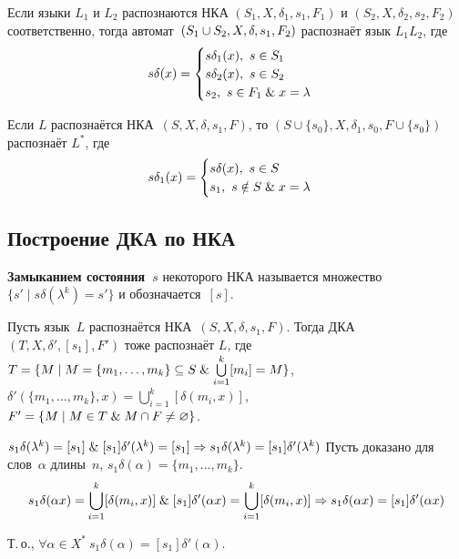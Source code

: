 Если языки $L_1$ и $L_2$ распознаются НКА $(S_1, X, \delta_1, s_1, F_1)$ и $(S_2, X, \delta_2, s_2, F_2)$ соответственно, тогда автомат~$(S_1 \opbr\cup S_2, \allowbreak X, \allowbreak \delta, \allowbreak s_1, \allowbreak F_2)$ распознаёт язык $L_1 L_2$, где
\begin{equation*}
s \delta(x) =
\begin{cases}
s \delta_1(x), \ s \in S_1 \\
s \delta_2(x), \ s \in S_2 \\
s_2, \ s \in F_1 \mathrel{\&} x = \lambda
\end{cases}
\end{equation*}

Если $L$ распознаётся НКА~$(S, X, \delta, s_1, F)$, то $(S \cup \{ s_0 \}, X, \delta_1, s_0, F \cup \{ s_0 \})$ распознаёт $L^*$, где
\begin{equation*}
s \delta_1(x) =
\begin{cases}
s \delta(x), \ s \in S \\
s_1, \ s \notin S \mathrel{\&} x = \lambda
\end{cases}
\end{equation*}

\subsection{Построение ДКА по НКА}
\label{sect:automaton_determination}
 \textbf{Замыканием состояния~$s$} некоторого НКА называется множество~$\{ s' \mid s \delta(\lambda^k) = s' \}$ и обозначается~$[s]$.

Пусть язык~$L$ распознаётся НКА~$(S, X, \delta, s_1, F)$.
Тогда ДКА~$(T, X, \delta', [s_1], F')$ тоже распознаёт $L$, где\\
$T = \{ M \mid M = \{ m_1, \ldots, m_k \} \subseteq S \mathrel{\&} \bigcup\limits_{i=1}^k [m_i] = M \}$,\\
$\delta'(\{ m_1, \ldots, m_k \}, x) = \bigcup\limits_{i=1}^k [\delta(m_i, x)]$,\\
$F' = \{ M \mid M \in T \mathrel{\&} M \cap F \neq \varnothing \}$.
\begin{proofmathind}
	\indbase $s_1 \delta(\lambda^k) = [s_1] \mathrel{\&} [s_1] \delta'(\lambda^k) = [s_1] \Rightarrow
	s_1 \delta(\lambda^k) = [s_1] \delta'(\lambda^k)$
	\indstep Пусть доказано для слов~$\alpha$ длины~$n$, $s_1 \delta(\alpha) = \{ m_1, \ldots, m_k \}$.
	\begin{equation*}
	s_1 \delta(\alpha x) = \bigcup_{i=1}^k [\delta(m_i, x)] \mathrel{\&}
	[s_1] \delta'(\alpha x) = \bigcup_{i=1}^k [\delta(m_i, x)] \Rightarrow
	s_1 \delta(\alpha x) = [s_1] \delta'(\alpha x)
	\end{equation*}
	\indend
	
Т.\,о., $\forall \alpha \in X^* \ s_1 \delta(\alpha) = [s_1] \delta'(\alpha)$.
\end{proofmathind}

